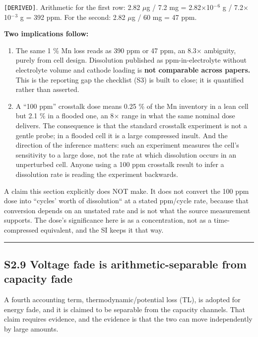 \documentclass[11pt,a4paper]{article}
\begin{document}
\texttt{[DERIVED]}. Arithmetic for the first row: 2.82 \ensuremath{\mu}g / 7.2 mg = 2.82\ensuremath{\times}10\ensuremath{^{-}}\ensuremath{^{6}} g / 7.2\ensuremath{\times}10\ensuremath{^{-}}\ensuremath{^{3}} g = 392 ppm. For the second: 2.82 \ensuremath{\mu}g / 60 mg = 47 ppm.


\textbf{Two implications follow:}


\begin{enumerate}
  \item The same 1 \% Mn loss reads as 390 ppm or 47 ppm, an 8.3\ensuremath{\times} ambiguity, purely from cell design. Dissolution published as ppm-in-electrolyte without electrolyte volume and cathode loading is \textbf{not comparable across papers.} This is the reporting gap the checklist (S3) is built to close; it is quantified rather than asserted.
  \item A \textquotedblleft{}100 ppm\textquotedblright{} crosstalk dose means 0.25 \% of the Mn inventory in a lean cell but 2.1 \% in a flooded one, an 8\ensuremath{\times} range in what the same nominal dose delivers. The consequence is that the standard crosstalk experiment is not a gentle probe; in a flooded cell it is a large compressed insult. And the direction of the inference matters: such an experiment measures the cell's sensitivity to a large dose, not the rate at which dissolution occurs in an unperturbed cell. Anyone using a 100 ppm crosstalk result to infer a dissolution rate is reading the experiment backwards.
\end{enumerate}


A claim this section explicitly does NOT make. It does not convert the 100 ppm dose into \textquotedblleft{}cycles' worth of dissolution\textquotedblleft{} at a stated ppm/cycle rate, because that conversion depends on an unstated rate and is not what the source measurement supports. The dose's significance here is as a concentration, not as a time-compressed equivalent, and the SI keeps it that way.


\par\noindent\rule{\linewidth}{0.4pt}\par


\subsection*{S2.9 Voltage fade is arithmetic-separable from capacity fade}


A fourth accounting term, thermodynamic/potential loss (TL), is adopted for energy fade, and it is claimed to be separable from the capacity channels. That claim requires evidence, and the evidence is that the two can move independently by large amounts.
\end{document}
